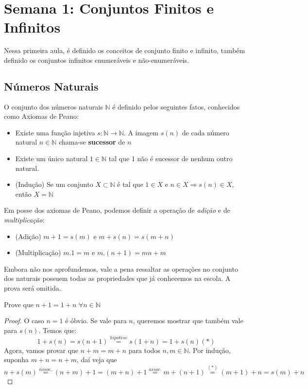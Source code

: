 \section{Semana 1: Conjuntos Finitos e Infinitos}

Nessa primeira aula, é definido os conceitos de conjunto finito e infinito, também definido os conjuntos infinitos enumeráveis e não-enumeráveis.

\subsection{Números Naturais}
O conjunto dos números naturais $\mathbb{N}$ é definido pelos seguintes fatos, conhecidos como Axiomas de Peano:

\begin{theorem}
\begin{itemize}
    \item Existe uma função injetiva $s:\mathbb{N}\rightarrow \mathbb{N}$. A imagem $s(n)$ de cada número natural $n \in \mathbb{N}$ chama-se \textbf{sucessor} de $n$
    \item Existe um único natural $1 \in \mathbb{N}$ tal que 1 não é sucessor de nenhum outro natural.
    \item (Indução) Se um conjunto $X\subset \mathbb{N}$ é tal que $1 \in X$ e $n\in X\Rightarrow s(n)\in X$, então $X=\mathbb{N}$
\end{itemize}
\end{theorem}
Em posse dos axiomas de Peano, podemos definir a operação de \textit{adição} e de \textit{multiplicação}:
\begin{itemize}
    \item (Adição) $m+1=s(m)$ e $m+s(n)=s(m+n)$
    \item (Multiplicação) $m.1=m$ e $m.(n+1)=mn+m$
\end{itemize}

Embora não nos aprofundemos, vale a pena ressaltar as operações no conjunto dos naturais possuem todas as propriedades que já conhecemos na escola. A prova será omitida.


\begin{prob}
Prove que $n+1=1+n$ $\forall n \in \mathbb{N}$
\end{prob}

\begin{proof}
O caso $n=1$ é óbvio. Se vale para $n$, queremos mostrar que também vale para $s(n)$. Temos que: $$1+s(n)=s(n+1)\overset{hipotese}{=}s(1+n)=1+s(n)(*)$$
Agora, vamos provar que $n+m=m+n$ para todos $n,m \in \mathbb{N}$. Por indução, suponha $m+n=n+m$, daí veja que $$n+s(m)\overset{assoc.}{=}(n+m)+1=(m+n)+1\overset{assoc.}{=}m+(n+1)\overset{(*)}{=}(m+1)+n=s(m)+n$$
\end{proof}

